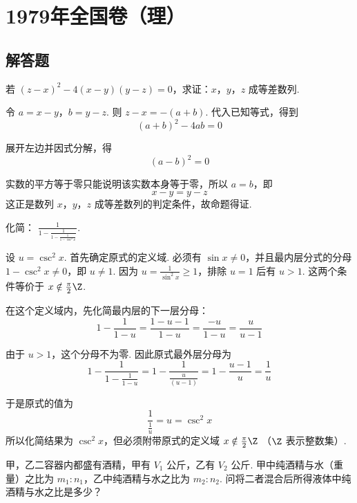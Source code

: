 \chapter{1979年全国卷（理）}
\section{解答题}

\begin{problem}
若 \(\left(z-x\right)^2-4\left(x-y\right)\left(y-z\right)=0\)，求证：\(x\)，\(y\)，\(z\) 成等差数列.
\end{problem}

\begin{solution}
令 \(a=x-y\)，\(b=y-z\).
则 \(z-x=-(a+b)\).
代入已知等式，得到
\[
(a+b)^2-4ab=0
\]

展开左边并因式分解，得
\[
 (a-b)^2=0
\]

实数的平方等于零只能说明该实数本身等于零，所以
\(
a=b
\)，即
\[
x-y=y-z
\]
这正是数列 \(x\)，\(y\)，\(z\) 成等差数列的判定条件，故命题得证.
\end{solution}

\begin{problem}
化简： \(\frac{1}{1-\frac{1}{1-\frac{1}{1-\csc^2 x}}}\).
\end{problem}

\begin{solution}
设 \(u=\csc^2x\).
首先确定原式的定义域. 必须有 \(\sin x\ne0\)，并且最内层分式的分母
\(1-\csc^2x\ne0\)，即 \(u\ne1\). 因为 \(u=\frac{1}{\sin^2x}\geq1\)，排除 \(u=1\) 后有 \(u>1\). 这两个条件等价于
\(x\notin\frac{\pi}{2}\Z\).

在这个定义域内，先化简最内层的下一层分母：
\[
1-\frac{1}{1-u}=\frac{1-u-1}{1-u}=\frac{-u}{1-u}=\frac{u}{u-1}
\]

由于 \(u>1\)，这个分母不为零. 因此原式最外层分母为
\[
1-\frac{1}{1-\frac{1}{1-u}}
=1-\frac{1}{\frac{u}{(u-1)}}
=1-\frac{u-1}{u}
=\frac{1}{u}
\]

于是原式的值为
\[
\frac{1}{\frac{1}{u}}=u=\csc^2x
\]
所以化简结果为 \(\csc^2x\)，但必须附带原式的定义域
\(
x\notin\frac{\pi}{2}\Z
\)
（\(\Z\) 表示整数集）.
\end{solution}

\begin{problem}
甲，乙二容器内都盛有酒精，甲有 \(V_{1}\text{ 公斤}\)，乙有 \(V_{2}\text{ 公斤}\). 甲中纯酒精与水（重量）之比为 \(m_{1}:n_{1}\)，乙中纯酒精与水之比为 \(m_{2}:n_{2}\). 问将二者混合后所得液体中纯酒精与水之比是多少？
\end{problem}

